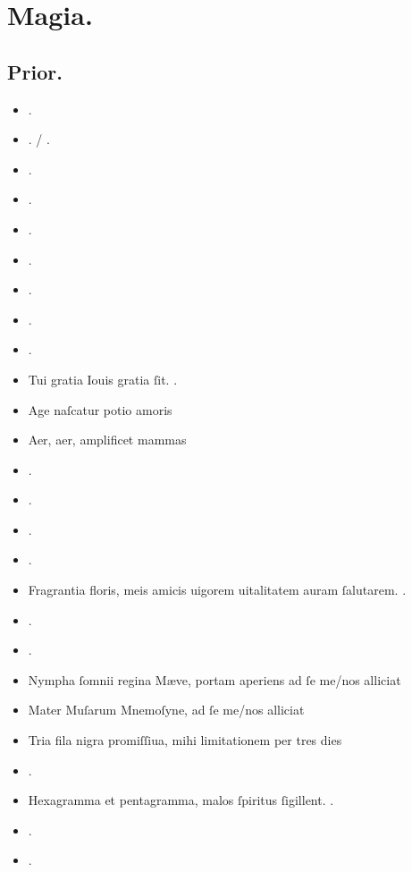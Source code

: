 \documentclass[12pt]{book}
\begin{document}
\chapter{Magia.}\label{magia}
\section{Prior.}\label{prior}

\begin{itemize}
  \item {}.
  \item {}. / .
  \item {}.
  \item {}.
  \item {}.
  \item {}.
  \item {}.
  \item {}.
  \item {}.
  \item Tui gratia Iouis gratia ſit. .
  \item Age naſcatur potio amoris \textelp{}
  \item Aer, aer, amplificet mammas \textelp{}
  \item {}.
  \item {}.
  \item {}.
  \item {}.
  \item Fragrantia floris, meis amicis uigorem uitalitatem auram ſalutarem. .
  \item {}.
  \item {}.
  \item Nympha ſomnii regina Mæve, portam aperiens ad ſe me/nos alliciat \textelp{}
  \item Mater Muſarum Mnemoſyne, ad ſe me/nos alliciat \textelp{}
  \item Tria fila nigra promiſſiua, mihi limitationem per tres dies \textelp{}
  \item {}.
  \item Hexagramma et pentagramma, malos ſpiritus ſigillent. .
  \item {} \textelp{} .
  \item {}.
\end{itemize}
\end{document}
